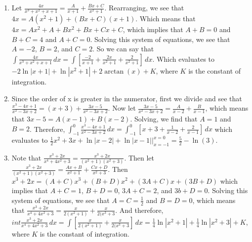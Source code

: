 \begin{Answer}[ref=partfrac]
\begin{enumerate}
\item Let $\frac{4x}{x^3 + x^2 + x + 1} = \frac{A}{x + 1} + \frac{Bx + C}{x^2 
+ 1}$. Rearranging, we see that $4x = A(x^2 + 1) + (Bx + C)(x + 1)$. Which 
means that $4x = Ax^2 + A + Bx^2 + Bx + Cx + C$, which implies that $A + B = 
0$ and $B + C = 4$ and $A + C = 0$. Solving this system of equations, we see 
that $A = -2$, $B = 2$, and $C = 2$. So we can say that $\int \frac{4x}{x^3 + 
x^2 + x + 1}\,dx = \int \left[ \frac{-2}{x + 1} + \frac{2x}{x^2 + 1} + \frac{2
}{x^2 + 1} \right]\,dx$. Which evaluates to $-2\ln{|x + 1|} + \ln{|x^2 + 1|} 
+ 2\arctan{(x)} + K$, where $K$ is the constant of integration.  
\item Since the order of x is greater in the numerator, first we divide and 
see that $\frac{x^3 - 4x + 1}{x^2 - 3x + 2} = (x + 3) + \frac{3x - 5}{x^2 - 3x 
+ 2}$. Now let $\frac{3x-5}{x^2 - 3x + 2} = \frac{A}{x-2} + \frac{B}{x - 1}$, 
which means that $3x - 5 = A(x - 1) + B(x - 2)$. Solving, we find that $A = 1$ 
and $B = 2$. Therefore, $\int_{-1}^0 \frac{x^3 - 4x + 1}{x^2 - 3x + 2}\,dx = 
\int_{-1}^0 \left[ x + 3 + \frac{1}{x-2} + \frac{2}{x-1} \right]\,dx$ which 
evaluates to $\frac{1}{2}x^2 + 3x + \ln{|x - 2|} + \ln{|x - 1|}|_{x = -1}^{x = 
0} = \frac{5}{2} - \ln{(3)}$. 
\item Note that $\frac{x^3 + 2x}{x^4 + 4x^2 + 3} = \frac{x^3 + 2x}{(x^2 + 1)(x^
2 + 3)}$. Then let $\frac{x^3 + 2x}{(x^2 + 1)(x^2 + 3)} = \frac{Ax + B}{x^2 + 1
} + \frac{Cx + D}{x^2 + 3}$. Then $x^3 + 2x = (A + C)x^3 + (B + D)x^2 + (3A + C
)x + (3B + D)$ which implies that $A + C = 1$, $B + D = 0$, $3A + C = 2$, and $
3b + D = 0$. Solving this system of equations, we see that $A = C = \frac{1}{2}
$ and $B = D = 0$, which means that $\frac{x^3 + 2x}{x^4 + 4x^2 + 3} = \frac{x
}{2(x^2 + 1)} + \frac{x}{2(x^3 + 3}$. And therefore, $int \frac{x^3 + 2x}{x^4 
+ 4x^2 + 3}\,dx = \int \left[ \frac{x}{2(x^2 + 1)} + \frac{x}{2(x^3 + 3} 
\right]\,dx = \frac{1}{4}\ln{|x^2 + 1|} + \frac{1}{4}\ln{|x^2 + 3|} + K$, 
where $K$ is the constant of integration. 
\end{enumerate}
\end{Answer}